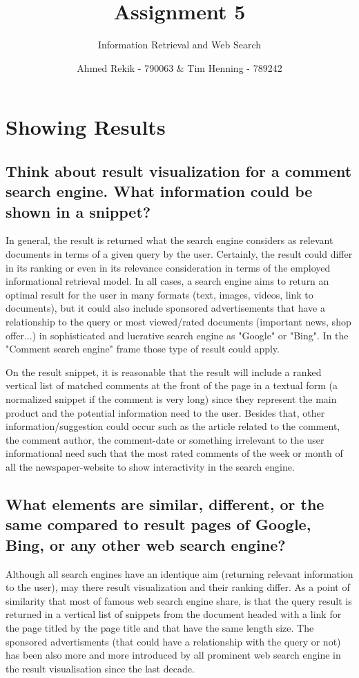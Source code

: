 \documentclass{scrartcl}
\title{Assignment 5}
\subtitle{Information Retrieval and Web Search}
\author{Ahmed Rekik - 790063 \& Tim Henning - 789242}
\begin{document}
\maketitle

\setcounter{section}{0}
\section{Showing Results}

\subsection{Think about result visualization for a comment search engine. What information could be
shown in a snippet?  }

In general, the result is returned what the search engine considers as relevant documents in terms of a given query by the user. Certainly, the result could differ in its ranking or even in its relevance consideration in terms of the employed informational retrieval model. In all cases, a search engine aims to return an optimal result for the user in many formats (text, images, videos, link to documents), but it could also include sponsored advertisements that have a relationship to the query or most viewed/rated documents (important news, shop offer...) in sophisticated and lucrative search engine as "Google" or "Bing". In the "Comment search engine" frame those type of result could apply.

On the result snippet, it is reasonable that the result will include a ranked vertical list of matched comments at the front of the page in a textual form (a normalized snippet if the comment is very long)  since they represent the main product and the potential information need to the user. Besides that, other information/suggestion could occur such as the article related to the comment, the comment author, the comment-date or something irrelevant to the user informational need such that the most rated comments of the week or month of all the newspaper-website to show interactivity in the search engine.



\subsection{What elements are similar, different, or the same compared to result pages of Google, Bing,
or any other web search engine?}

Although all search engines have an identique aim (returning relevant information to the user), may there result visualization and their ranking differ. As a point of similarity that most of famous web search engine share, is that the query result is returned in a vertical list of snippets from the document headed with a link for the page titled by the page title and that have the same length size. The sponsored advertisments (that could have a relationship with the query or not) has been also more and more introduced by all prominent web search engine in the result visualisation since the last decade. 
\end{document}
